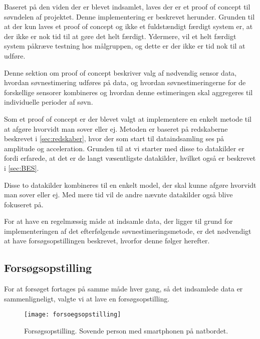 Baseret på den viden der er blevet indsamlet, laves der er et proof of concept til søvndelen af projektet.
Denne implementering er beskrevet herunder.
Grunden til at der kun laves et proof of concept og ikke et fuldstændigt færdigt system er, at der ikke er nok tid til at gøre det helt færdigt. 
Ydermere, vil et helt færdigt system påkræve testning hos målgruppen, og dette er der ikke er tid nok til at udføre. 

Denne sektion om proof of concept beskriver valg af nødvendig sensor data, hvordan søvnestimering udføres på data, og hvordan søvnestimeringerne for de forskellige sensorer kombineres og hvordan denne estimeringen skal aggregeres til individuelle perioder af søvn.


Som et proof of concept er der blevet valgt at implementere en enkelt metode til at afgøre hvorvidt man sover eller ej.
Metoden er baseret på redskaberne beskrevet i \cref{sec:redskaber}, hvor der som start til dataindsamling ses på amplitude og acceleration.
Grunden til at vi starter med disse to datakilder er fordi \citet{6563918} erfarede, at det er de langt væsentligste datakilder, hvilket også er beskrevet i \cref{sec:BES}.

Disse to datakilder kombineres til en enkelt model, der skal kunne afgøre hvorvidt man sover eller ej.
Med mere tid vil de andre nævnte datakilder også blive fokuseret på.

For at have en regelmæssig måde at indsamle data, der ligger til grund for implementeringen af det efterfølgende søvnestimeringsmetode, er det nødvendigt at have forsøgsopstillingen beskrevet, hvorfor denne følger herefter.
\subsection{Forsøgsopstilling}
For at forsøget fortages på samme måde hver gang, så det indsamlede data er sammenligneligt, valgte vi at lave en forsøgsopstilling.
\begin{figure}[h]
	\centering
	\texttt{[image: forsoegsopstilling]}
	\caption{Forsøgsopstilling. Sovende person med smartphonen på natbordet.}
	\label{fig:forsoegopstillings}
\end{figure}

